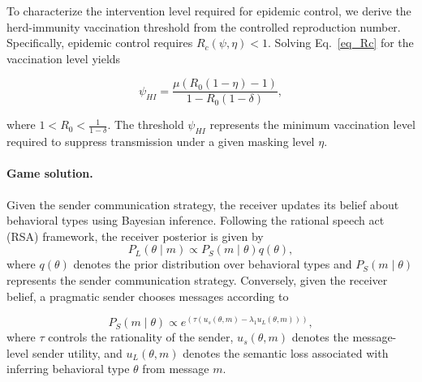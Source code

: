 \documentclass[sigconf,review]{acmart}
\begin{document}
To characterize the intervention level required for epidemic control, we derive the herd-immunity vaccination threshold from the controlled reproduction number. Specifically, epidemic control requires $R_c(\psi,\eta)<1$.
Solving Eq.~\eqref{eq_Rc} for the vaccination level yields

\begin{equation}
\psi_{HI}
=
\frac{
\mu
\left(
R_0(1-\eta)-1
\right)
}
{
1-R_0(1-\delta)
},
\label{eq:psi_HI}
\end{equation}

where $1<R_0<\frac{1}{1-\delta}$.
The threshold $\psi_{HI}$ represents the minimum vaccination level
required to suppress transmission under a given masking level $\eta$.



\paragraph{Game solution.}


Given the sender communication strategy, the receiver updates its belief about behavioral types using Bayesian inference. Following the rational speech act (RSA) framework, the receiver posterior is given by
\begin{equation} P_L(\theta\mid m) \propto P_S(m\mid\theta)q(\theta), \label{eq:rsa_listener} 
\end{equation} 
where $q(\theta)$ denotes the prior distribution over behavioral types and $P_S(m\mid\theta)$ represents the sender communication strategy. 
Conversely, given the receiver belief, a pragmatic sender chooses messages according to

\begin{equation} 
P_S(m\mid\theta) \propto e^ {\left( \tau \left(u_s(\theta,m) - \lambda_1 u_L(\theta,m) \right) \right)}, 
\label{eq:rsa_speaker} 
\end{equation} 
where $\tau$ controls the rationality of the sender, $u_s(\theta,m)$ denotes the message-level sender utility, and $u_L(\theta,m)$ denotes the semantic loss associated with inferring behavioral type $\theta$ from message $m$.
\end{document}
